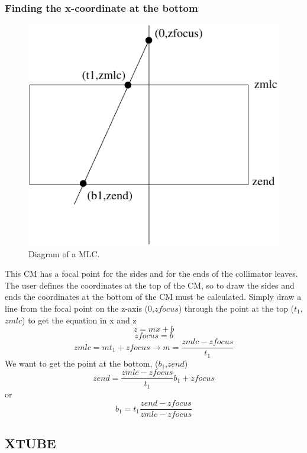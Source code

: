 \documentclass[12pt]{book}
\begin{document}
\subsubsection{Finding the x-coordinate at the bottom}
\begin{figure}[htbp]
\vspace{1.8in}
\includegraphics{figures/mlcfig}
\caption{Diagram of a MLC.  \label{mlcfig}}
\end{figure}

This CM has a focal point for the sides and for the ends of the
collimator leaves.  The user defines the coordinates at the top of the
CM, so to draw the sides and ends the coordinates at the bottom of the
CM must be calculated.  Simply draw a line from the focal point on the
z-axis (0,$zfocus$) through the point at the top ($t_1$,$zmlc$) to get the
equation in x and z
$$z=mx+b$$
$$zfocus=b$$
$$zmlc=mt_1+zfocus \rightarrow m=\frac{zmlc-zfocus}{t_1}$$
We want to get the point at the bottom, ($b_1$,$zend$)
$$zend=\frac{zmlc-zfocus}{t_1}b_1+zfocus$$
or
$$b_1=t_1\frac{zend-zfocus}{zmlc-zfocus}$$

\subsection{XTUBE}
\end{document}
